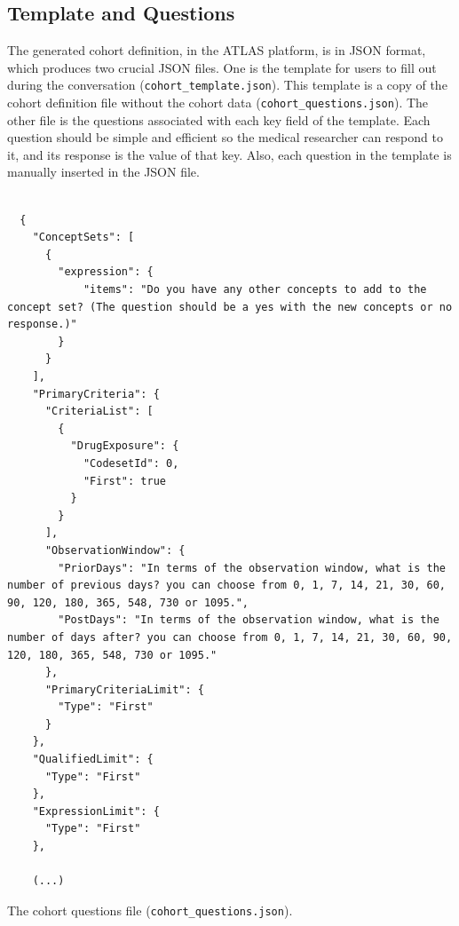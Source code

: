 \subsection{Template and Questions}

The generated cohort definition, in the ATLAS platform, is in JSON format, which produces two crucial JSON files. One is the template for users to fill out during the conversation {\small\normalfont(\texttt{cohort\_template.json})}. This template is a copy of the cohort definition file without the cohort data {\small\normalfont(\texttt{cohort\_questions.json})}. The other file is the questions associated with each key field of the template. Each question should be simple and efficient so the medical researcher can respond to it, and its response is the value of that key. Also, each question in the template is manually inserted in the JSON file.  



\begin{listing}[H]
  \begin{verbatim}
      
  {
    "ConceptSets": [
      {
        "expression": {
            "items": "Do you have any other concepts to add to the concept set? (The question should be a yes with the new concepts or no response.)"
        }
      }
    ],
    "PrimaryCriteria": {
      "CriteriaList": [
        {
          "DrugExposure": {
            "CodesetId": 0,
            "First": true
          }
        }
      ],
      "ObservationWindow": {
        "PriorDays": "In terms of the observation window, what is the number of previous days? you can choose from 0, 1, 7, 14, 21, 30, 60, 90, 120, 180, 365, 548, 730 or 1095.",
        "PostDays": "In terms of the observation window, what is the number of days after? you can choose from 0, 1, 7, 14, 21, 30, 60, 90, 120, 180, 365, 548, 730 or 1095."
      },
      "PrimaryCriteriaLimit": {
        "Type": "First"
      }
    },
    "QualifiedLimit": {
      "Type": "First"
    },
    "ExpressionLimit": {
      "Type": "First"
    },

    (...)
  \end{verbatim}
  \caption{The cohort questions file {\small\normalfont(\texttt{cohort\_questions.json})}.}
  \label{questions}
  \end{listing}

